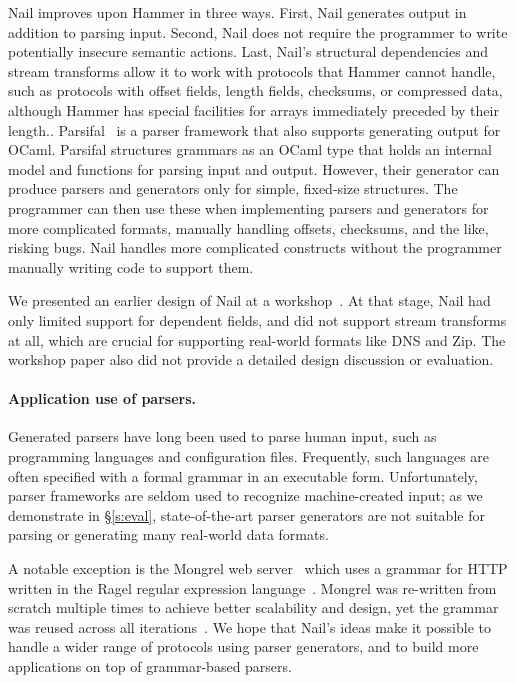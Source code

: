 Nail improves upon Hammer in three ways.  First, Nail generates output in
addition to parsing input.  Second, Nail does not require the programmer
to write potentially insecure semantic actions.  Last, Nail's structural
dependencies and stream transforms allow it to work with protocols that
Hammer cannot handle, such as protocols with offset fields, length fields,
checksums, or compressed data, although Hammer has special facilities for  arrays immediately preceded by their length..  
Parsifal~\cite{ANSSI:parsifal} is a parser framework that also supports
generating output for OCaml.  Parsifal structures grammars as an OCaml
type that holds an internal model and functions for parsing input and
output.  However, their generator can produce parsers and generators
only for simple, fixed-size structures.  The programmer can then use
these when implementing parsers and generators for more complicated
formats, manually handling offsets, checksums, and the like, risking bugs.
Nail handles more complicated constructs without the programmer manually
writing code to support them.

We presented an earlier design of Nail at a
workshop~\cite{bangert:nail-langsec-anon}.  At that stage, Nail had only
limited support for dependent fields, and did not support stream
transforms at all, which are crucial for supporting real-world formats
like DNS and Zip.  The workshop paper also did not provide a detailed
design discussion or evaluation.


\paragraph{Application use of parsers.}

Generated parsers have long been used to parse human input, such
as programming languages and configuration files. Frequently, such
languages are often specified with a formal grammar in an executable
form. Unfortunately, parser frameworks are seldom used to recognize
machine-created input; as we demonstrate in \S\ref{s:eval},
state-of-the-art parser generators are not suitable for parsing or
generating many real-world data formats.

A notable exception is the Mongrel web server~\cite{mongrel} which
uses a grammar for HTTP written in the Ragel regular expression
language~\cite{ragel-paper}.  Mongrel was re-written from scratch
multiple times to achieve better scalability and design, yet the
grammar was reused across all iterations~\cite{patterson-citation}.
We hope that Nail's ideas make it possible to handle a wider range of
protocols using parser generators, and to build more applications on
top of grammar-based parsers.


